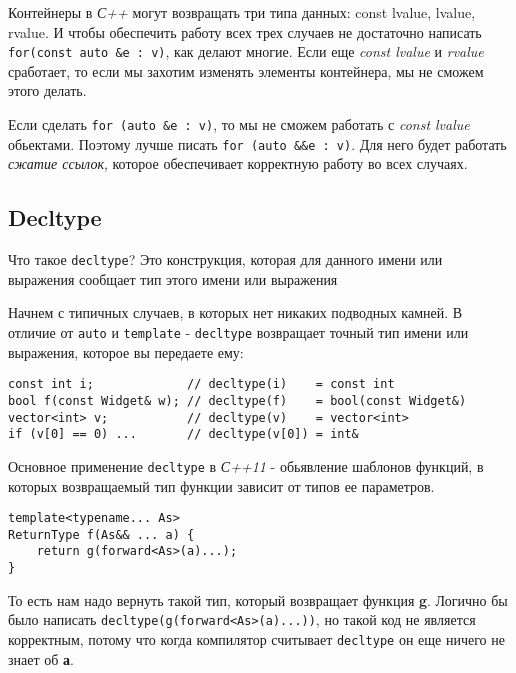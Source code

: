 \begin{enumerate}
		Контейнеры в \textit{С++} могут возвращать три типа данных: const lvalue, lvalue, rvalue. И чтобы обеспечить работу всех трех случаев не достаточно написать \texttt{for(const auto &e : v)}, как делают многие. Если еще \textit{const lvalue} и \textit{rvalue} сработает, то если мы захотим изменять элементы контейнера, мы не сможем этого делать. 
		
		Если сделать \texttt{for (auto &e : v)}, то мы не сможем работать с \textit{const lvalue} обьектами. Поэтому лучше писать \texttt{for (auto &&e : v)}. Для него будет работать \textit{сжатие ссылок}, которое обеспечивает корректную работу во всех случаях.
		
	\end{enumerate}

	\subsection {Decltype}
		Что такое \texttt{decltype}? Это конструкция, которая для данного имени или выражения сообщает тип этого имени или выражения
		
		Начнем с типичных случаев, в которых нет никаких подводных камней. В отличие от \texttt{auto} и \texttt{template} - \texttt{decltype} возвращает точный тип имени или выражения, которое вы передаете ему:
		
\begin{verbatim}
const int i;             // decltype(i)    = const int
bool f(const Widget& w); // decltype(f)    = bool(const Widget&)
vector<int> v;           // decltype(v)    = vector<int>
if (v[0] == 0) ...       // decltype(v[0]) = int&
\end{verbatim}
		
		Основное применение \texttt{decltype} в \textit{С++11} - обьявление шаблонов функций, в которых возвращаемый тип функции зависит от типов ее параметров.
\begin{verbatim}		
template<typename... As>
ReturnType f(As&& ... a) {
	return g(forward<As>(a)...);
}
\end{verbatim}
		То есть нам надо вернуть такой тип, который возвращает функция \textbf{g}. Логично бы было написать \texttt{decltype(g(forward<As>(a)...))}, но такой код не является корректным, потому что когда компилятор считывает \texttt{decltype} он еще ничего не знает об \textbf{а}.
		
